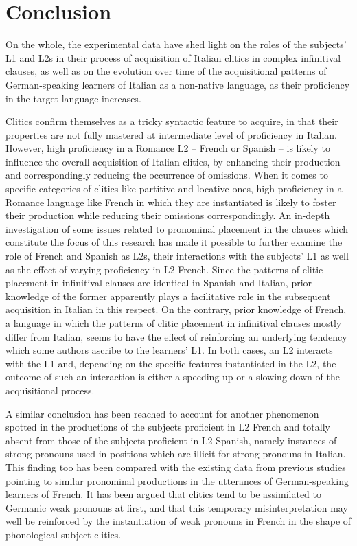 \documentclass[output=paper,modfonts,nonflat,newtxmath]{langsci/langscibook}
\begin{document}
\section{Conclusion} %

\label{sec:sciutti:6}

On the whole, the experimental data have shed light on the roles of the subjects’ L1 and L2s in their process of acquisition of Italian clitics in complex infinitival clauses, as well as on the evolution over time of the acquisitional patterns of German-speaking learners of Italian as a non-native language, as their proficiency in the target language increases.

Clitics confirm themselves as a tricky syntactic feature to acquire, in that their properties are not fully mastered at intermediate level of proficiency in Italian. However, high proficiency in a Romance L2 – French or Spanish – is likely to influence the overall acquisition of Italian clitics, by enhancing their production and correspondingly reducing the occurrence of omissions. When it comes to specific categories of clitics like partitive and locative ones, high proficiency in a Romance language like French in which they are instantiated is likely to foster their production while reducing their omissions correspondingly. An in-depth investigation of some issues related to pronominal placement in the clauses which constitute the focus of this research has made it possible to further examine the role of French and Spanish as L2s, their interactions with the subjects’ L1 as well as the effect of varying proficiency in L2 French. Since the patterns of clitic placement in infinitival clauses are identical in Spanish and Italian, prior knowledge of the former apparently plays a facilitative role in the subsequent acquisition in Italian in this respect. On the contrary, prior knowledge of French, a language in which the patterns of clitic placement in infinitival clauses mostly differ from Italian, seems to have the effect of reinforcing an underlying tendency which some authors ascribe to the learners’ L1. In both cases, an L2 interacts with the L1 and, depending on the specific features instantiated in the L2, the outcome of such an interaction is either a speeding up or a slowing down of the acquisitional process.

A similar conclusion has been reached to account for another phenomenon spotted in the productions of the subjects proficient in L2 French and totally absent from those of the subjects proficient in L2 Spanish, namely instances of strong pronouns used in positions which are illicit for strong pronouns in Italian. This finding too has been compared with the existing data from previous studies pointing to similar pronominal productions in the utterances of German-speaking learners of French. It has been argued that clitics tend to be assimilated to Germanic weak pronouns at first, and that this temporary misinterpretation may well be reinforced by the instantiation of weak pronouns in French in the shape of phonological subject clitics.
\end{document}
